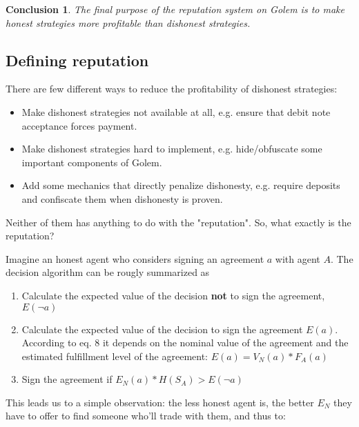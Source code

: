 \documentclass{article}
\newtheorem{conclusion}{Conclusion}[section]
\begin{document}
\begin{conclusion}

The final purpose of the reputation system on Golem is to make honest strategies more profitable than dishonest strategies.

\label{main purpose conclusion}
\end{conclusion}


\subsection{Defining reputation}

There are few different ways to reduce the profitability of dishonest strategies:

\begin{itemize}
\item{Make dishonest strategies not available at all, e.g. ensure that debit note acceptance forces payment.}
\item{Make dishonest strategies hard to implement, e.g. hide/obfuscate some important components of Golem.}
\item{Add some mechanics that directly penalize dishonesty, e.g. require deposits and confiscate them when dishonesty is proven.}
\end{itemize}

Neither of them has anything to do with the "reputation". So, what exactly is the reputation?

Imagine an honest agent who considers signing an agreement $a$ with agent $A$. The decision algorithm can be rougly summarized as
\begin{enumerate}
\item{Calculate the expected value of the decision \textbf{not} to sign the agreement, $E(\neg a)$}
\item{Calculate the expected value of the decision to sign the agreement $E(a)$. 
    According to eq. 8 it depends on the nominal value of the agreement 
    and the estimated fulfillment level of the agreement: $E(a) = V_N(a) * F_A(a)$}
\item{Sign the agreement if $E_N(a) * H(S_A) > E(\neg a)$}
\end{enumerate}

This leads us to a simple observation: the less honest agent is, the better $E_N$ they have to offer to find someone who'll trade with them, and thus to:
\end{document}
